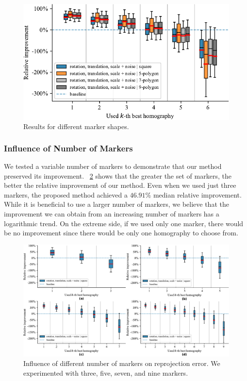 \begin{figure}[t]
    \centering
    \includegraphics[width=\boxplotimgwidth]{figures/homography/shape_influence.pdf}
    \caption[Influence of marker shape]{Results for different marker shapes.}
    \label{fig:ShapeInfluence}
\end{figure}

\subsubsection{Influence of Number of Markers}

We tested a variable number of markers to demonstrate that our method preserved its improvement. \figstr{}~\ref{fig:NMarkersInfluence} shows that the greater the set of markers, the better the relative improvement of our method. Even when we used just three markers, the proposed method achieved a $46.91$\% median relative improvement.
While it is beneficial to use a larger number of markers, we believe that the improvement we can obtain from an increasing number of markers has a logarithmic trend. On the extreme side, if we used only one marker, there would be no improvement since there would be only one homography to choose from.

\begin{figure}[t]
    \centering
    \includegraphics[width=\linewidth]{figures/homography/n_markers_influence.pdf}
    \caption[Influence of number of markers]{Influence of different number of markers on reprojection error. We experimented with  three,  five,  seven, and  nine markers.}
    \label{fig:NMarkersInfluence}
\end{figure}


